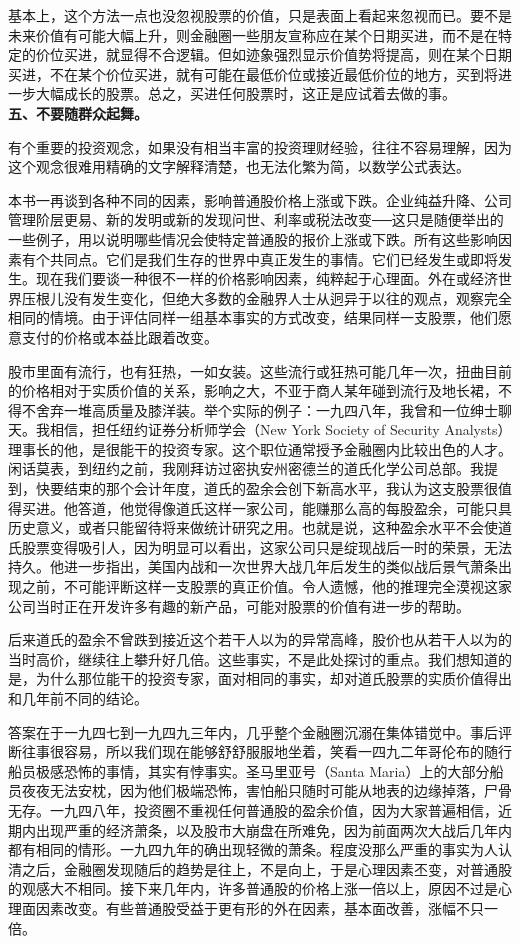 \documentclass[UTF8,a4paper,zihao=-4,fontset = windows]{ctexart} %
\begin{document}
基本上，这个方法一点也没忽视股票的价值，只是表面上看起来忽视而已。要不是未来价值有可能大幅上升，则金融圈一些朋友宣称应在某个日期买进，而不是在特定的价位买进，就显得不合逻辑。但如迹象强烈显示价值势将提高，则在某个日期买进，不在某个价位买进，就有可能在最低价位或接近最低价位的地方，买到将进一步大幅成长的股票。总之，买进任何股票时，这正是应试着去做的事。
\\

\textbf{五、不要随群众起舞。}


有个重要的投资观念，如果没有相当丰富的投资理财经验，往往不容易理解，因为这个观念很难用精确的文字解释清楚，也无法化繁为简，以数学公式表达。

本书一再谈到各种不同的因素，影响普通股价格上涨或下跌。企业纯益升降、公司管理阶层更易、新的发明或新的发现问世、利率或税法改变──这只是随便举出的一些例子，用以说明哪些情况会使特定普通股的报价上涨或下跌。所有这些影响因素有个共同点。它们是我们生存的世界中真正发生的事情。它们已经发生或即将发生。现在我们要谈一种很不一样的价格影响因素，纯粹起于心理面。外在或经济世界压根儿没有发生变化，但绝大多数的金融界人士从迥异于以往的观点，观察完全相同的情境。由于评估同样一组基本事实的方式改变，结果同样一支股票，他们愿意支付的价格或本益比跟着改变。

股市里面有流行，也有狂热，一如女装。这些流行或狂热可能几年一次，扭曲目前的价格相对于实质价值的关系，影响之大，不亚于商人某年碰到流行及地长裙，不得不舍弃一堆高质量及膝洋装。举个实际的例子：一九四八年，我曾和一位绅士聊天。我相信，担任纽约证券分析师学会（New York Society of Security Analysts）理事长的他，是很能干的投资专家。这个职位通常授予金融圈内比较出色的人才。闲话莫表，到纽约之前，我刚拜访过密执安州密德兰的道氏化学公司总部。我提到，快要结束的那个会计年度，道氏的盈余会创下新高水平，我认为这支股票很值得买进。他答道，他觉得像道氏这样一家公司，能赚那么高的每股盈余，可能只具历史意义，或者只能留待将来做统计研究之用。也就是说，这种盈余水平不会使道氏股票变得吸引人，因为明显可以看出，这家公司只是绽现战后一时的荣景，无法持久。他进一步指出，美国内战和一次世界大战几年后发生的类似战后景气萧条出现之前，不可能评断这样一支股票的真正价值。令人遗憾，他的推理完全漠视这家公司当时正在开发许多有趣的新产品，可能对股票的价值有进一步的帮助。

后来道氏的盈余不曾跌到接近这个若干人以为的异常高峰，股价也从若干人以为的当时高价，继续往上攀升好几倍。这些事实，不是此处探讨的重点。我们想知道的是，为什么那位能干的投资专家，面对相同的事实，却对道氏股票的实质价值得出和几年前不同的结论。

答案在于一九四七到一九四九三年内，几乎整个金融圈沉溺在集体错觉中。事后评断往事很容易，所以我们现在能够舒舒服服地坐着，笑看一四九二年哥伦布的随行船员极感恐怖的事情，其实有悖事实。圣马里亚号（Santa Maria）上的大部分船员夜夜无法安枕，因为他们极端恐怖，害怕船只随时可能从地表的边缘掉落，尸骨无存。一九四八年，投资圈不重视任何普通股的盈余价值，因为大家普遍相信，近期内出现严重的经济萧条，以及股市大崩盘在所难免，因为前面两次大战后几年内都有相同的情形。一九四九年的确出现轻微的萧条。程度没那么严重的事实为人认清之后，金融圈发现随后的趋势是往上，不是向上，于是心理因素丕变，对普通股的观感大不相同。接下来几年内，许多普通股的价格上涨一倍以上，原因不过是心理面因素改变。有些普通股受益于更有形的外在因素，基本面改善，涨幅不只一倍。
\end{document}
